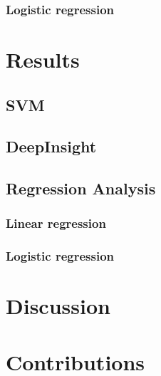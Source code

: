 \documentclass[12pt,letterpaper]{article}
\begin{document}
\subsubsection{Logistic regression}
%




\section{Results}

\subsection{SVM}
%

\subsection{DeepInsight}
%

\subsection{Regression Analysis}
\subsubsection{Linear regression}
%

\subsubsection{Logistic regression}
%



\section{Discussion}



\section{Contributions}
\end{document}
